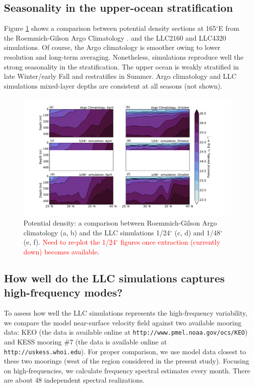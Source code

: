\documentclass[grl]{agutex2015}
\begin{document}
\begin{article}
\subsection*{Seasonality in the upper-ocean stratification}

Figure \ref{figS2_1} shows a comparison between potential density sections
at 165$^\circ$E from
the Roemmich-Gilson Argo Climatology \citep[updated from][]{roemmich_gilson2009}.
and the LLC2160 and LLC4320 simulations. Of course, the Argo climatology is smoother
owing to lower resolution and long-term averaging. Nonetheless, simulations reproduce well the strong
seasonality in the stratification. The upper ocean is weakly stratified in late Winter/early Fall
and restratifies in Summer. Argo climatology and LLC simulations mixed-layer depths are consistent
at all seasons (not shown).

\begin{figure}[ht]
   \begin{center}
     \includegraphics[width=1.\textwidth]{figs/fig_s2_1.pdf}
  \caption{Potential density: a comparison between Roemmich-Gilson Argo
          climatology (a, b) and the LLC simulations 1/24$^\circ$ (c, d)
          and  1/48$^\circ$ (e, f). \textcolor{red}{Need to re-plot  the 1/24$^\circ$
          figures once extraction (currently down) becomes available}.}
  \label{figS2_1}
  \end{center}
\end{figure}

\subsection*{How well do the LLC simulations captures high-frequency modes?}
To assess how well the LLC simulations represents the high-frequency variability,
we compare the model near-surface velocity field against two available
mooring data: KEO (the data is available online at \texttt{http://www.pmel.noaa.gov/ocs/KEO})
and KESS mooring $\#$7 (the data is available online at \texttt{http://uskess.whoi.edu}).
For proper comparison, we use model data closest to these two moorings (west of
the region considered in the present study). Focusing on high-frequencies, we
calculate frequency spectral estimates every month. There are about 48 independent
spectral realizations.


\end{article}
\end{document}

